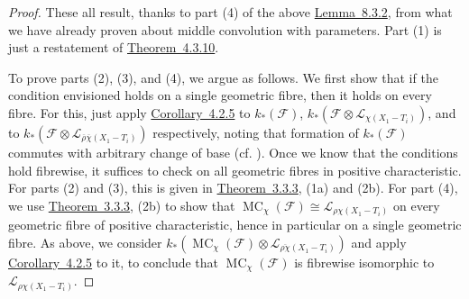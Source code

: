\begin{proof}
These all result, thanks to part (4) of the above \hyperref[lem:8.3.2]{Lemma~8.3.2}, from what we have already proven about middle convolution with parameters. Part (1) is just a restatement of \hyperref[thm:4.3.10]{Theorem~4.3.10}.

To prove parts (2), (3), and (4), we argue as follows. We first show that if the condition envisioned holds on a single geometric fibre, then it holds on every fibre. For this, just apply \hyperref[cor:4.2.5]{Corollary~4.2.5} to \(k_*(\mathcal{F})\), \(k_*(\mathcal{F}\otimes\mathcal{L}_{\chi(X_1-T_i)})\), and to \(k_*(\mathcal{F}\otimes\mathcal{L}_{\overline{\rho}\overline{\chi}(X_1-T_i)})\) respectively, noting that formation of \(k_*(\mathcal{F})\) commutes with arbitrary change of base (cf. \cite[4.7.2 and 4.7.3]{Ka-SE}). Once we know that the conditions hold fibrewise, it suffices to check on all geometric fibres in positive characteristic. For parts (2) and (3), this is given in \hyperref[thm:3.3.3]{Theorem~3.3.3}, (1a) and (2b). For part (4), we use \hyperref[thm:3.3.3]{Theorem~3.3.3}, (2b) to show that \(\operatorname{MC}_\chi(\mathcal{F})\cong\mathcal{L}_{\rho\chi(X_1-T_i)}\) on every geometric fibre of positive characteristic, hence in particular on a single geometric fibre. As above, we consider \(k_*(\operatorname{MC}_\chi(\mathcal{F})\otimes\mathcal{L}_{\overline{\rho\chi}(X_1-T_i)})\) and apply \hyperref[cor:4.2.5]{Corollary~4.2.5} to it, to conclude that \(\operatorname{MC}_\chi(\mathcal{F})\) is fibrewise isomorphic to \(\mathcal{L}_{\rho\chi(X_1-T_i)}\).
\end{proof}

